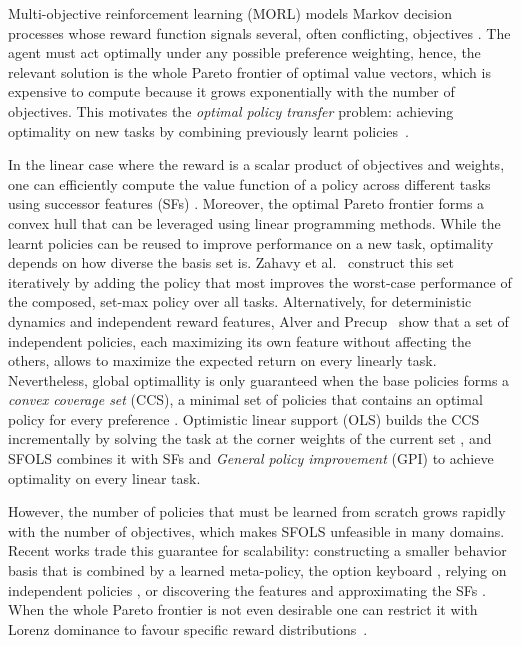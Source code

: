 \documentclass[11pt]{article}
\begin{document}
Multi-objective reinforcement learning (MORL) models Markov decision processes whose reward function signals several, often conflicting, objectives \cite{roijers_survey_2013,hayes_practical_2022}. The agent must act optimally under any possible preference weighting, hence, the relevant solution is the whole Pareto frontier of optimal value vectors, which is expensive to compute because it grows exponentially with the number of objectives. This motivates the \textit{optimal policy transfer} problem: achieving optimality on new tasks by combining previously learnt policies~\cite{alegre_optimistic_2022}.

In the linear case where the reward is a scalar product of objectives and weights, one can efficiently compute the value function of a policy across different tasks using successor features (SFs) \cite{roijers_multi-objective_2016, barreto_fast_2020}. Moreover, the optimal Pareto frontier forms a convex hull that can be leveraged using linear programming methods. While the learnt policies can be reused to improve performance on a new task, optimality depends on how diverse the basis set is. Zahavy et al.~\cite{zahavy_discovering_2021} construct this set iteratively by adding the policy that most improves the worst-case performance of the composed, set-max policy over all tasks. Alternatively, for deterministic dynamics and independent reward features, Alver and Precup~\cite{alver_constructing_2022} show that a set of independent policies, each maximizing its own feature without affecting the others, allows to maximize the expected return on every linearly task. Nevertheless, global optimallity is only guaranteed when the base policies forms a \textit{convex coverage set} (CCS), a minimal set of policies that contains an optimal policy for every preference \cite{roijers_multi-objective_2016}. Optimistic linear support (OLS) builds the CCS incrementally by solving the task at the corner weights of the current set \cite{roijers_multi-objective_2016}, and SFOLS \cite{alegre_optimistic_2022} combines it with SFs and \textit{General policy improvement} (GPI) to achieve optimality on every linear task. 

However, the number of policies that must be learned from scratch grows rapidly with the number of objectives, which makes SFOLS unfeasible in many domains. Recent works trade this guarantee for scalability: constructing a smaller behavior basis that is combined by a learned meta-policy, the option keyboard \cite{alegre_constructing_2025}, relying on independent policies \cite{alver_constructing_2022}, or discovering the features and approximating the SFs \cite{carvalho_combining_2023}. When the whole Pareto frontier is not even desirable one can restrict it with Lorenz dominance to favour specific reward distributions~\cite{michailidis_scalable_2026}.
\end{document}
